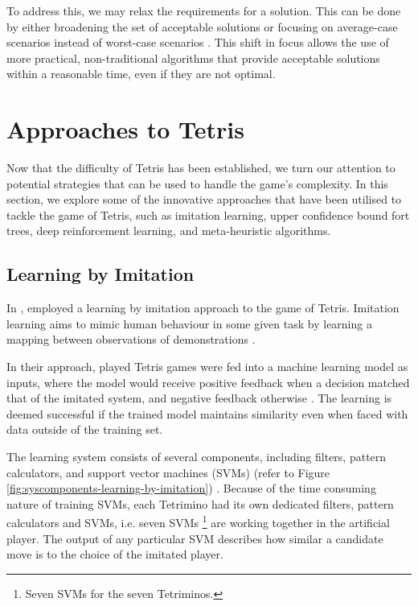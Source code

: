 \documentclass[a4paper, 12pt]{extreport}
\begin{document}
				To address this, we may relax the requirements for a solution. This can be done by either broadening the set of acceptable solutions or focusing on average-case scenarios instead of worst-case scenarios \cite{cc:conceptual-perspective}. This shift in focus allows the use of more practical, non-traditional algorithms that provide acceptable solutions within a reasonable time, even if they are not optimal. 
							
		\section{Approaches to Tetris}
		
			
			Now that the difficulty of Tetris has been established, we turn our attention to potential strategies that can be used to handle the game's complexity. In this section, we explore some of the innovative approaches that have been utilised to tackle the game of Tetris, such as imitation learning, upper confidence bound fort trees, deep reinforcement learning, and meta-heuristic algorithms.
			
			\subsection{Learning by Imitation} \label{subsec:imit-learning}
			
				In \citeyear{tetris-learning-by-imitation}, \citeauthor{tetris-learning-by-imitation} \cite{tetris-learning-by-imitation} employed a learning by imitation approach to the game of Tetris. Imitation learning aims to mimic human behaviour in some given task by learning a mapping between observations of demonstrations \cite{imitation-learning}.
				
				In their approach, played Tetris games were fed into a machine learning model as inputs, where the model would receive positive feedback when a decision matched that of the imitated system, and negative feedback otherwise \cite{tetris-learning-by-imitation}. The learning is deemed successful if the trained model maintains similarity even when faced with data outside of the training set.
				
				The learning system consists of several components, including filters, pattern calculators, and support vector machines (SVMs) (refer to Figure \ref{fig:syscomponents-learning-by-imitation}) \cite{tetris-learning-by-imitation}. Because of the time consuming nature of training SVMs, each Tetrimino had its own dedicated filters, pattern calculators and SVMs, i.e. seven SVMs \footnote{Seven SVMs for the seven Tetriminos.} are working together in the artificial player. The output of any particular SVM describes how similar a candidate move is to the choice of the imitated player.
				
\end{document}
